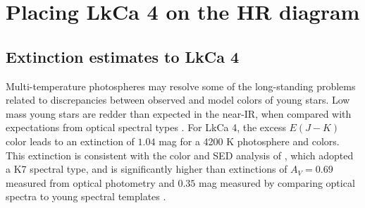 \documentclass[twocolumn]{emulateapj}%
\begin{document}
\section{Placing LkCa 4 on the HR diagram}



\subsection{Extinction estimates to LkCa 4}

Multi-temperature photospheres may resolve some of the long-standing problems related to discrepancies between observed and model colors of young stars.  Low mass young stars are redder than expected in the near-IR, when compared with expectations from optical spectral types \citep[e.g.][]{tottle15}.  For LkCa 4, the excess $E(J-K)$ color leads to an extinction of $1.04$ mag for a 4200 K photosphere and \citep{pecaut13} colors.  This extinction is consistent with the color and SED analysis of \citet{furlan06}, which adopted a K7 spectral type, and is significantly higher than extinctions of $A_V=0.69$ measured from optical photometry \citep{kenyon95} and $0.35$ mag measured by comparing optical spectra to young spectral templates \citep{herczeg14}.  
\end{document}
